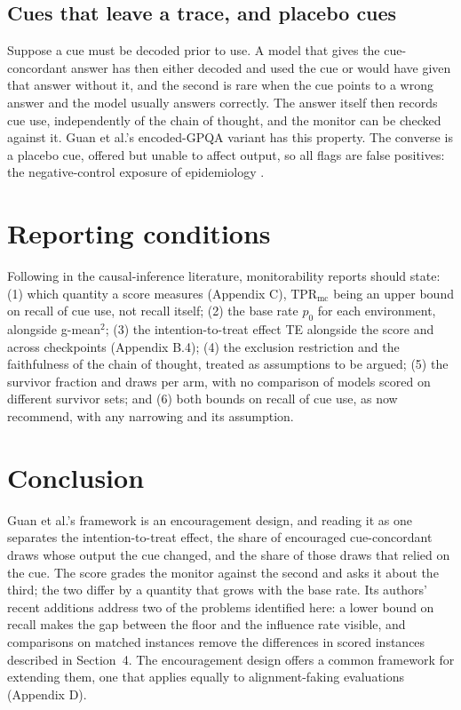 \documentclass[11pt,a4paper]{article}
\begin{document}
\subsection{Cues that leave a trace, and placebo cues}
Suppose a cue must be decoded prior to use. A model that gives the cue-concordant answer has then either decoded and used the cue or would have given that answer without it, and the second is rare when the cue points to a wrong answer and the model usually answers correctly. The answer itself then records cue use, independently of the chain of thought, and the monitor can be checked against it. Guan et al.’s encoded-GPQA variant has this property. The converse is a placebo cue, offered but unable to affect output, so all flags are false positives: the negative-control exposure of epidemiology \citep{lipsitch2010negative}.

\section{Reporting conditions}
Following \citet{cook2008three} in the causal-inference literature, monitorability reports should state: (1) which quantity a score measures (Appendix C), $\mathrm{TPR}_{\mathrm{mc}}$ being an upper bound on recall of cue use, not recall itself; (2) the base rate $p_0$ for each environment, alongside g-mean$^2$; (3) the intention-to-treat effect TE alongside the score and across checkpoints (Appendix B.4); (4) the exclusion restriction and the faithfulness of the chain of thought, treated as assumptions to be argued; (5) the survivor fraction and draws per arm, with no comparison of models scored on different survivor sets; and (6) both bounds on recall of cue use, as \citet*{guan2026beyond} now recommend, with any narrowing and its assumption.

\section{Conclusion}
Guan et al.’s framework is an encouragement design, and reading it as one separates the intention-to-treat effect, the share of encouraged cue-concordant draws whose output the cue changed, and the share of those draws that relied on the cue. The score grades the monitor against the second and asks it about the third; the two differ by a quantity that grows with the base rate. Its authors’ recent additions address two of the problems identified here: a lower bound on recall makes the gap between the floor and the influence rate visible, and comparisons on matched instances remove the differences in scored instances described in Section~4. The encouragement design offers a common framework for extending them, one that applies equally to alignment-faking evaluations (Appendix D).
\end{document}
